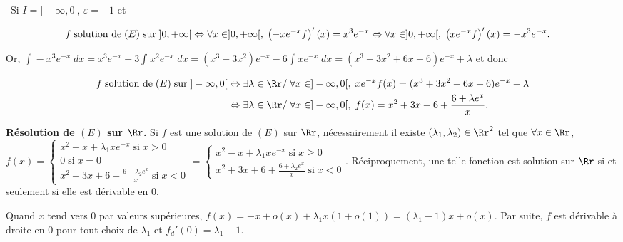 {\begin{enumerate}
{\begin{center}
\shadowbox{
$\mathcal{S}_{]0,+\infty[}=\left\{x\mapsto x^2-x+\lambda xe^{-x},\;\lambda\in\Rr\right\}$.
}
\end{center}

\textbullet~Si $I=]-\infty,0[$, $\varepsilon=-1$ et 

\begin{align*}\ensuremath
f\;\text{solution de}\;(E)\;\text{sur}\;]0,+\infty[&\Leftrightarrow\forall x\in ]0,+\infty[,\;\left(-xe^{-x}f\right)'(x)=x^3e^{-x}
\Leftrightarrow\forall x\in ]0,+\infty[,\;\left(xe^{-x}f\right)'(x)=-x^3e^{-x}.
\end{align*}

Or, $\int_{}^{}-x^3e^{-x}\;dx=x^3e^{-x}-3\int_{}^{}x^2e^{-x}\;dx=(x^3+3x^2)e^{-x}-6\int_{}^{}xe^{-x}\;dx=(x^3+3x^2+6x+6)e^{-x}+\lambda$ et donc

\begin{align*}\ensuremath
f\;\text{solution de}\;(E)\;\text{sur}\;]-\infty,0[&\Leftrightarrow\exists\lambda\in\Rr/\;\forall x\in]-\infty,0[,\;xe^{-x}f(x)=(x^3+3x^2+6x+6)e^{-x}+\lambda\\
 &\Leftrightarrow\exists\lambda\in\Rr/\;\forall x\in]-\infty,0[,\;f(x)=x^2+3x+6+ \frac{6+\lambda e^x}{x}.
\end{align*}

\begin{center}
\shadowbox{
$\mathcal{S}_{]0,+\infty[}=\left\{x\mapsto x^2+3x+6+ \frac{6+\lambda e^x}{x},\;\lambda\in\Rr\right\}$.
}
\end{center}

\textbf{Résolution de $(E)$ sur $\Rr$.} Si $f$ est une solution de $(E)$ sur $\Rr$, nécessairement il existe $(\lambda_1,\lambda_2)\in\Rr^2$ tel que $\forall x\in\Rr$, $f(x)=\left\{
\begin{array}{l}
x^2-x+\lambda_1 xe^{-x}\;\text{si}\;x>0\\
0\;\text{si}\;x=0\\
x^2+3x+6+ \frac{6+\lambda_2 e^x}{x}\;\text{si}\;x<0
\end{array}
\right.=\left\{
\begin{array}{l}
x^2-x+\lambda_1 xe^{-x}\;\text{si}\;x\geqslant0\\
x^2+3x+6+ \frac{6+\lambda_2 e^x}{x}\;\text{si}\;x<0
\end{array}
\right.$. Réciproquement, une telle fonction est solution sur $\Rr$ si et seulement si elle est dérivable en $0$.

Quand $x$ tend vers $0$ par valeurs supérieures, $f(x)=-x+o(x)+\lambda_1 x(1+o(1))=(\lambda_1-1)x+o(x)$. Par suite, $f$ est dérivable à droite en $0$ pour tout choix de $\lambda_1$ et $f_d'(0)=\lambda_1-1$.

}
\end{enumerate}}
